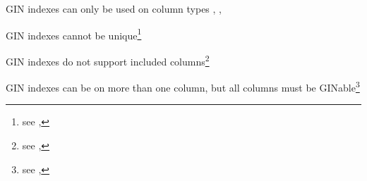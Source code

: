 \begin{oparts}
\item
  GIN indexes can only be used on column types ,
  , 
\item
  GIN indexes cannot be unique\footnote{%
    see , }
\item
  GIN indexes do not support included columns\footnote{%
    see , }
\item
  GIN indexes can be on more than one column, but all columns must be
  GINable\footnote{%
    see , }
\end{oparts}
